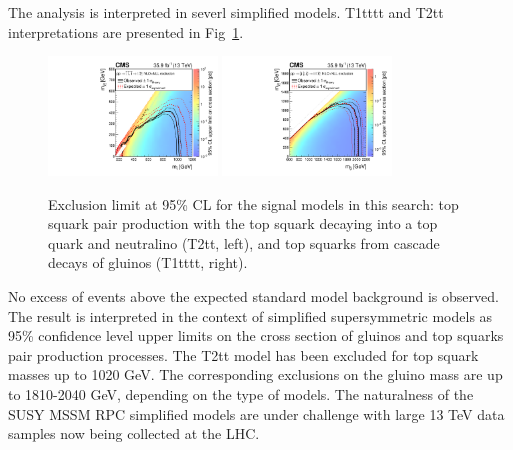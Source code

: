 \documentclass{PoS}
\begin{document}
The analysis is interpreted in severl simplified models\cite{Alwall:2008ag}. T1tttt and T2tt interpretations are presented in Fig~\ref{fig:signal_results}. 

\begin{figure}[ht!]
 \begin{centering}
  \includegraphics[width=0.40\textwidth]{figures/Covered_T2tt_OnlyXSEC.pdf}
  \includegraphics[width=0.40\textwidth]{figures/T1tttt_OnlyXSEC.pdf}
  \caption{Exclusion limit at 95\% CL for the signal models in this search: top squark pair production with the top squark decaying into a top quark and neutralino (T2tt, left), and top squarks from cascade decays of gluinos (T1tttt, right).}
  \label{fig:signal_results}
 \end{centering}
\end{figure}

No excess of events above the expected standard model background is observed. The result is interpreted in the context of simplified supersymmetric models as 95\% confidence level upper limits on the cross section of gluinos and top squarks pair production processes. The T2tt model has been excluded for top squark masses up to 1020 GeV. The corresponding exclusions on the gluino mass are up to 1810-2040 GeV, depending on the type of models. The naturalness\cite{Papucci:2011wy} of the SUSY MSSM RPC simplified models are under challenge with large 13 TeV data samples now being collected at the LHC.

\clearpage


\end{document}

